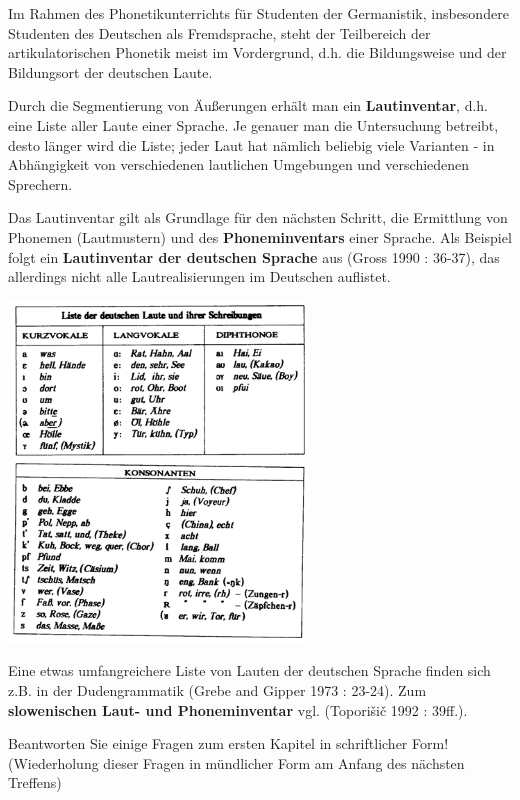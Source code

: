 \documentclass[
  letterpaper,
]{scrbook}
\begin{document}
Im Rahmen des Phonetikunterrichts für Studenten der Germanistik,
insbesondere Studenten des Deutschen als Fremdsprache, steht der
Teilbereich der artikulatorischen Phonetik meist im Vordergrund, d.h.
die Bildungsweise und der Bildungsort der deutschen Laute.

Durch die Segmentierung von Äußerungen erhält man ein
\textbf{Lautinventar}, d.h. eine Liste aller Laute einer Sprache. Je
genauer man die Untersuchung betreibt, desto länger wird die Liste;
jeder Laut hat nämlich beliebig viele Varianten - in Abhängigkeit von
verschiedenen lautlichen Umgebungen und verschiedenen Sprechern.

Das Lautinventar gilt als Grundlage für den nächsten Schritt, die
Ermittlung von Phonemen (Lautmustern) und des \textbf{Phoneminventars}
einer Sprache. Als Beispiel folgt ein \textbf{Lautinventar der deutschen
Sprache} aus (Gross 1990 : 36-37), das allerdings nicht alle
Lautrealisierungen im Deutschen auflistet.

\includegraphics[width=0.6\textwidth,height=\textheight]{./pictures/01b_NSG_Intro_2020-10-07/deutsche_phone.png}

Eine etwas umfangreichere Liste von Lauten der deutschen Sprache finden
sich z.B. in der Dudengrammatik (Grebe and Gipper 1973 : 23-24). Zum
\textbf{slowenischen Laut- und Phoneminventar} vgl. (Toporišič 1992 :
39ff.).

Beantworten Sie einige Fragen zum ersten Kapitel in schriftlicher Form!
(Wiederholung dieser Fragen in mündlicher Form am Anfang des nächsten
Treffens)
\end{document}
